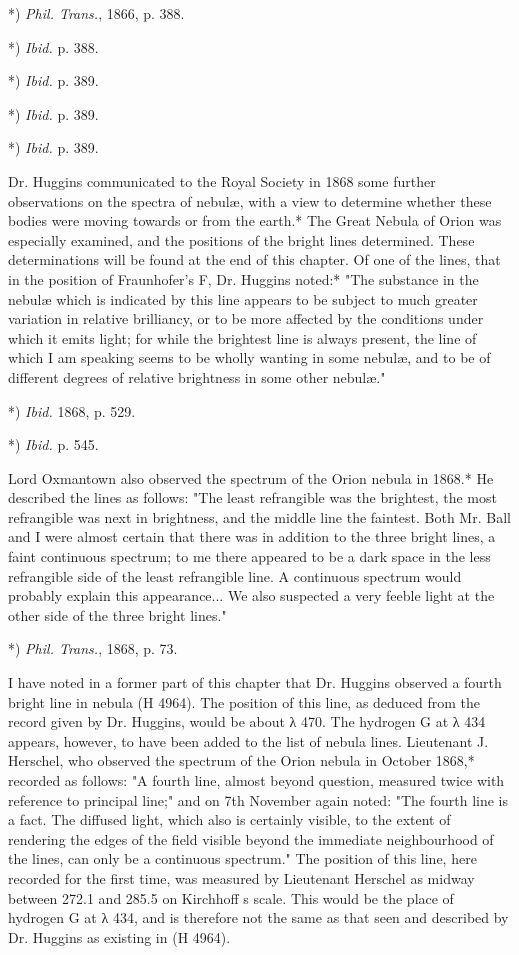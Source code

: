 \documentclass[a4paper, 12pt, oneside, polutonikogreek, english]{article}
\begin{document}
*) \emph{Phil. Trans.}, 1866, p. 388.

*) \emph{Ibid.} p. 388.

*) \emph{Ibid.} p. 389.

*) \emph{Ibid.} p. 389.

*) \emph{Ibid.} p. 389.

Dr. Huggins communicated to the Royal Society in 1868 some further observations on the spectra of nebulæ, with a view to determine whether these bodies were moving towards or from the earth.* The Great Nebula of Orion was especially examined, and the positions of the bright lines determined. These determinations will be found at the end of this chapter. Of one of the lines, that in the position of Fraunhofer's F, Dr. Huggins noted:* "The substance in the nebulæ which is indicated by this line appears to be subject to much greater variation in relative brilliancy, or to be more affected by the conditions under which it emits light; for while the brightest line is always present, the line of which I am speaking seems to be wholly wanting in some nebulæ, and to be of different degrees of relative brightness in some other nebulæ."

*) \emph{Ibid.} 1868, p. 529.

*) \emph{Ibid.} p. 545.

Lord Oxmantown also observed the spectrum of the Orion nebula in 1868.* He described the lines as follows: "The least refrangible was the brightest, the most refrangible was next in brightness, and the middle line the faintest. Both Mr. Ball and I were almost certain that there was in addition to the three bright lines, a faint continuous spectrum; to me there appeared to be a dark space in the less refrangible side of the least refrangible line. A continuous spectrum would probably explain this appearance... We also suspected a very feeble light at the other side of the three bright lines."

*) \emph{Phil. Trans.}, 1868, p. 73.

I have noted in a former part of this chapter that Dr. Huggins observed a fourth bright line in nebula (H 4964). The position of this line, as deduced from the record given by Dr. Huggins, would be about λ 470. The hydrogen G at λ 434 appears, however, to have been added to the list of nebula lines. Lieutenant J. Herschel, who observed the spectrum of the Orion nebula in October 1868,* recorded as follows: "A fourth line, almost beyond question, measured twice with reference to principal line;" and on 7th November again noted: "The fourth line is a fact. The diffused light, which also is certainly visible, to the extent of rendering the edges of the field visible beyond the immediate neighbourhood of the lines, can only be a continuous spectrum." The position of this line, here recorded for the first time, was measured by Lieutenant Herschel as midway between 272.1 and 285.5 on Kirchhoff s scale. This would be the place of hydrogen G at λ 434, and is therefore not the same as that seen and described by Dr. Huggins as existing in (H 4964).
\end{document}

